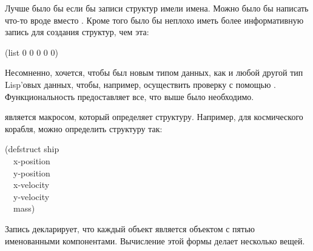 Лучше было бы если бы записи структур имели имена. Можно было бы написать что-то
вроде  вместо . Кроме того было
бы неплохо иметь более информативную запись для создания структур, чем эта:
\begin{lisp}
(list 0 0 0 0 0)
\end{lisp}
Несомненно, хочется, чтобы  был новым типом данных, как и любой другой
тип Lisp'овых данных, чтобы, например, осуществить проверку с помощью
.
Функциональность  предоставляет все, что выше было необходимо.

 является макросом, который определяет структуру. Например, для
космического корабля, можно определить структуру так:
\begin{lisp}
(defstruct ship \\
~~x-position \\
~~y-position \\
~~x-velocity \\
~~y-velocity \\
~~mass)
\end{lisp}
Запись декларирует, что каждый объект  является объектом с пятью
именованными компонентами. Вычисление этой формы делает несколько вещей.

